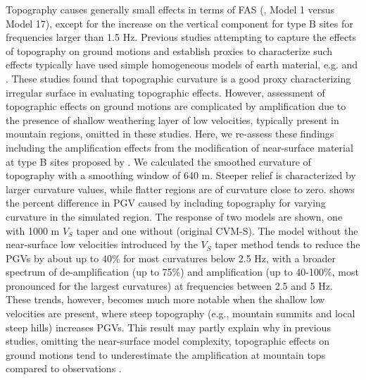 Topography causes generally small effects in terms of FAS (, Model 1 versus Model 17), except for the increase on the vertical component for type B sites for frequencies larger than 1.5 Hz. %
Previous studies attempting to capture the effects of topography on ground motions and establish proxies to characterize such effects typically have used simple homogeneous models of earth material, e.g. \citet{maufroyFrequencyScaledCurvature2015} and \citet{raiEmpiricalTerrainBasedTopographic2017}.  These studies found that topographic curvature is a good proxy characterizing irregular surface in evaluating topographic effects. However, assessment of topographic effects on ground motions are complicated by amplification due to the presence of shallow weathering layer of low velocities, typically present in mountain regions, omitted in these studies. Here, we re-assess these findings including the amplification effects from the modification of near-surface material at type B sites proposed by \citet{huCalibrationNearsurfaceSeismic2021}. We calculated the smoothed curvature of topography with a smoothing window of 640 m.
Steeper relief is characterized by larger curvature values, while flatter regions are of curvature close to zero.  shows the percent difference in PGV caused by including topography for varying curvature in the simulated region. The response of two models are shown, one with 1000 m $V_S$ taper \citep{huCalibrationNearsurfaceSeismic2021} and one without (original CVM-S). The model without the near-surface low velocities introduced by the $V_S$ taper method tends to reduce the PGVs by about up to 40\% for most curvatures below 2.5 Hz, with a broader spectrum of de-amplification (up to 75\%) and amplification (up to 40-100\%, most pronounced for the largest curvatures) at frequencies between 2.5 and 5 Hz. These trends, however, becomes much more notable when the shallow low velocities are present, where steep topography (e.g., mountain summits and local steep hills) increases PGVs. This result may partly explain why in previous studies, omitting the near-surface model complexity, topographic effects on ground motions tend to underestimate the amplification at mountain tops compared to observations .



